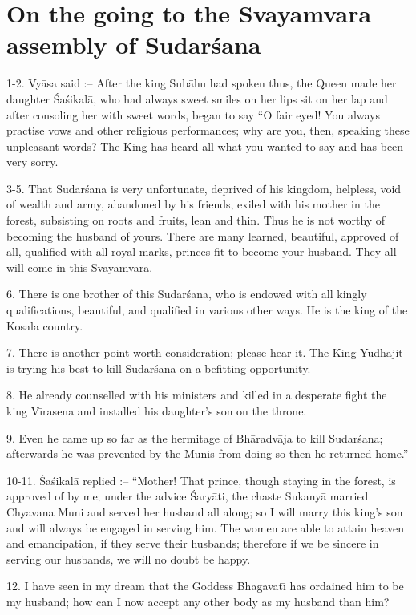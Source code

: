 \chapter{On the going to the Svayamvara assembly of Sudar\'sana}

1-2. Vy\=asa said :-- After the king Sub\=ahu had spoken thus, the Queen made her daughter \'Sa\'sikal\=a, who had always sweet smiles on her lips sit on her lap and after consoling her with sweet words, began to say ``O fair eyed! You always practise vows and other religious performances; why are you, then, speaking these unpleasant words? The King has heard all what you wanted to say and has been very sorry.

3-5. That Sudar\'sana is very unfortunate, deprived of his kingdom, helpless, void of wealth and army, abandoned by his friends, exiled with his mother in the forest, subsisting on roots and fruits, lean and thin. Thus he is not worthy of becoming the husband of yours. There are many learned, beautiful, approved of all, qualified with all royal marks, princes fit to become your husband. They all will come in this Svayamvara.

6. There is one brother of this Sudar\'sana, who is endowed with all kingly qualifications, beautiful, and qualified in various other ways. He is the king of the Kosala country.

7. There is another point worth consideration; please hear it. The King Yudh\=ajit is trying his best to kill Sudar\'sana on a befitting opportunity.

8. He already counselled with his ministers and killed in a desperate fight the king V\={\i}rasena and installed his daughter's son on the throne.

9. Even he came up so far as the hermitage of Bh\=aradv\=aja to kill Sudar\'sana; afterwards he was prevented by the Munis from doing so then he returned home.''

10-11. \'Sa\'sikal\=a replied :-- ``Mother! That prince, though staying in the forest, is approved of by me; under the advice \'Sary\=ati, the chaste Sukany\=a married Chyavana Muni and served her husband all along; so I will marry this king's son and will always be engaged in serving him. The women are able to attain heaven and emancipation, if they serve their husbands; therefore if we be sincere in serving our husbands, we will no doubt be happy.

12. I have seen in my dream that the Goddess Bhagavat\={\i} has ordained him to be my husband; how can I now accept any other body as my husband than him?

